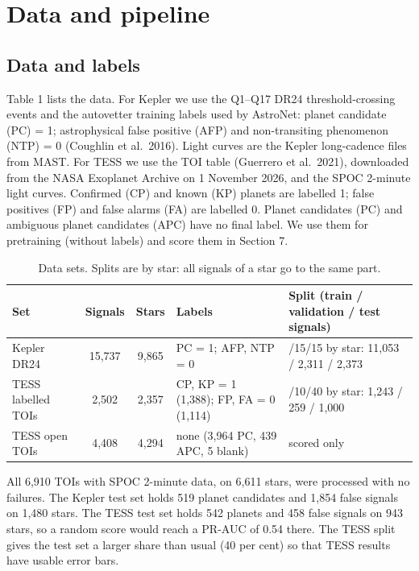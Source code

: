 \documentclass[fleqn,usenatbib]{mnras}
\begin{document}
\section{Data and pipeline}

\subsection{Data and labels}

Table 1 lists the data. For Kepler we use the Q1--Q17 DR24 threshold-crossing events and the autovetter training labels used by AstroNet: planet candidate (PC) = 1; astrophysical false positive (AFP) and non-transiting phenomenon (NTP) = 0 (Coughlin et al.~2016). Light curves are the Kepler long-cadence files from MAST. For TESS we use the TOI table (Guerrero et al.~2021), downloaded from the NASA Exoplanet Archive on 1 November 2026, and the SPOC 2-minute light curves. Confirmed (CP) and known (KP) planets are labelled 1; false positives (FP) and false alarms (FA) are labelled 0. Planet candidates (PC) and ambiguous planet candidates (APC) have no final label. We use them for pretraining (without labels) and score them in Section 7.

\begin{table}
\centering
\caption{Data sets. Splits are by star: all signals of a star go to the same part.}
\label{tab:1}
\begin{tabular}{lcc>{\raggedright\arraybackslash}p{4.8cm}>{\raggedright\arraybackslash}p{5.1cm}}
\hline
Set & Signals & Stars & Labels & Split (train / validation / test signals) \\
\hline
Kepler DR24 & 15,737 & 9,865 & PC = 1; AFP, NTP = 0 & 70/15/15 by star: 11,053 / 2,311 / 2,373 \\
TESS labelled TOIs & 2,502 & 2,357 & CP, KP = 1 (1,388); FP, FA = 0 (1,114) & 50/10/40 by star: 1,243 / 259 / 1,000 \\
TESS open TOIs & 4,408 & 4,294 & none (3,964 PC, 439 APC, 5 blank) & scored only \\
\hline
\end{tabular}
\end{table}

All 6,910 TOIs with SPOC 2-minute data, on 6,611 stars, were processed with no failures. The Kepler test set holds 519 planet candidates and 1,854 false signals on 1,480 stars. The TESS test set holds 542 planets and 458 false signals on 943 stars, so a random score would reach a PR-AUC of 0.54 there. The TESS split gives the test set a larger share than usual (40 per cent) so that TESS results have usable error bars.
\end{document}
